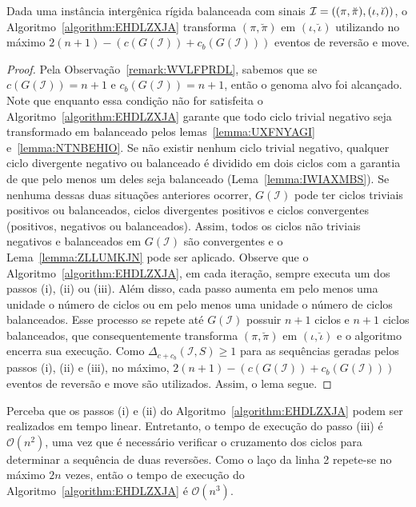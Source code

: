 \begin{lemma}\label{lemma:APHTXLZC}
Dada uma instância intergênica rígida balanceada com sinais $\mathcal{I}=((\pi,\breve\pi),\break(\iota,\breve\iota))$, o Algoritmo~\ref{algorithm:EHDLZXJA} transforma $(\pi,\breve\pi)$ em $(\iota,\breve\iota)$ utilizando no máximo $2(n + 1) - (c(G(\mathcal{I})) + c_b(G(\mathcal{I})))$ eventos de reversão e move.
\end{lemma}
\begin{proof}
Pela Observação~\ref{remark:WVLFPRDL}, sabemos que se $c(G(\mathcal{I})) = {n + 1}$ e $c_b(G(\mathcal{I})) = {n + 1}$, então o genoma alvo foi alcançado. Note que enquanto essa condição não for satisfeita o Algoritmo~\ref{algorithm:EHDLZXJA} garante que todo ciclo trivial negativo seja transformado em balanceado pelos lemas~\ref{lemma:UXFNYAGI} e~\ref{lemma:NTNBEHIO}. Se não existir nenhum ciclo trivial negativo, qualquer ciclo divergente negativo ou balanceado é dividido em dois ciclos com a garantia de que pelo menos um deles seja balanceado (Lema~\ref{lemma:IWIAXMBS}). Se nenhuma dessas duas situações anteriores ocorrer, $G(\mathcal{I})$ pode ter ciclos triviais positivos ou balanceados, ciclos divergentes positivos e ciclos convergentes (positivos, negativos ou balanceados). Assim, todos os ciclos não triviais negativos e balanceados em $G(\mathcal{I})$ são convergentes e o Lema~\ref{lemma:ZLLUMKJN} pode ser aplicado. Observe que o Algoritmo~\ref{algorithm:EHDLZXJA}, em cada iteração, sempre executa um dos passos (i), (ii) ou (iii). Além disso, cada passo aumenta em pelo menos uma unidade o número de ciclos ou em pelo menos uma unidade o número de ciclos balanceados. Esse processo se repete até $G(\mathcal{I})$ possuir ${n+1}$ ciclos e ${n+1}$ ciclos balanceados, que consequentemente transforma $(\pi, \breve\pi)$ em $(\iota,\breve\iota)$ e o algoritmo encerra sua execução.  Como $\Delta_{c+c_b}(\mathcal{I},S) \ge 1$ para as sequências geradas pelos passos (i), (ii) e (iii), no máximo, $2(n + 1) - (c(G(\mathcal{I})) + c_b(G(\mathcal{I})))$ eventos de reversão e move são utilizados. Assim, o lema segue.
\end{proof}

Perceba que os passos (i) e (ii) do Algoritmo~\ref{algorithm:EHDLZXJA} podem ser realizados em tempo linear. Entretanto, o tempo de execução do passo (iii) é $\mathcal{O}(n^2)$, uma vez que é necessário verificar o cruzamento dos ciclos para determinar a sequência de duas reversões. Como o laço da linha 2 repete-se no máximo $2n$ vezes, então o tempo de execução do Algoritmo~\ref{algorithm:EHDLZXJA} é $\mathcal{O}(n^3)$.

